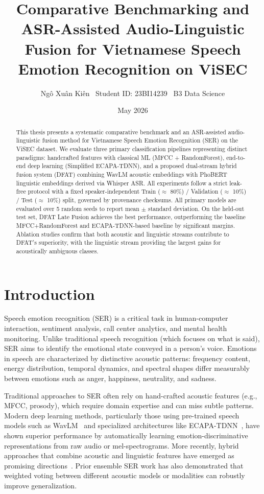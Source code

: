\documentclass[12pt,a4paper]{report}
\title{Comparative Benchmarking and ASR-Assisted Audio-Linguistic Fusion for Vietnamese Speech Emotion Recognition on ViSEC}
\author{
    Ngô Xuân Kiên \
    Student ID: 23BI14239 \ 
    B3 Data Science
}
\date{May 2026}
\begin{document}
\maketitle

\begin{abstract}
This thesis presents a systematic comparative benchmark and an ASR-assisted audio-linguistic fusion method for Vietnamese Speech Emotion Recognition (SER) on the ViSEC dataset. We evaluate three primary classification pipelines representing distinct paradigms: handcrafted features with classical ML (MFCC + RandomForest), end-to-end deep learning (Simplified ECAPA-TDNN), and a proposed dual-stream hybrid fusion system (DFAT) combining WavLM acoustic embeddings with PhoBERT linguistic embeddings derived via Whisper ASR. All experiments follow a strict leak-free protocol with a fixed speaker-independent Train ($\approx$ 80\%) / Validation ($\approx$ 10\%) / Test ($\approx$ 10\%) split, governed by provenance checksums. All primary models are evaluated over 5 random seeds to report mean $\pm$ standard deviation. On the held-out test set, DFAT Late Fusion achieves the best performance, outperforming the baseline MFCC+RandomForest and ECAPA-TDNN-based baseline by significant margins. Ablation studies confirm that both acoustic and linguistic streams contribute to DFAT's superiority, with the linguistic stream providing the largest gains for acoustically ambiguous classes.
\end{abstract}

\tableofcontents

\chapter{Introduction}
Speech emotion recognition (SER) is a critical task in human-computer interaction, sentiment analysis, call center analytics, and mental health monitoring. Unlike traditional speech recognition (which focuses on what is said), SER aims to identify the emotional state conveyed in a person's voice. Emotions in speech are characterized by distinctive acoustic patterns: frequency content, energy distribution, temporal dynamics, and spectral shapes differ measurably between emotions such as anger, happiness, neutrality, and sadness.

Traditional approaches to SER often rely on hand-crafted acoustic features (e.g., MFCC, prosody), which require domain expertise and can miss subtle patterns. Modern deep learning methods, particularly those using pre-trained speech models such as WavLM~\cite{wavlm} and specialized architectures like ECAPA-TDNN~\cite{ecapa}, have shown superior performance by automatically learning emotion-discriminative representations from raw audio or mel-spectrograms. More recently, hybrid approaches that combine acoustic and linguistic features have emerged as promising directions~\cite{ser_multimodal}. Prior ensemble SER work has also demonstrated that weighted voting between different acoustic models or modalities can robustly improve generalization.
\end{document}
